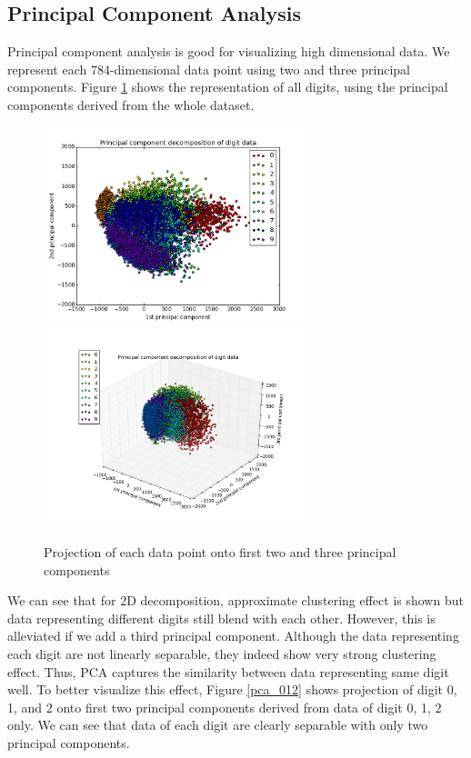 \documentclass[11pt]{article}
\begin{document}
\begin{multicols}{2}
\subsection*{Principal Component Analysis}
Principal component analysis is good for visualizing high dimensional data. We represent each 784-dimensional data point using two and three principal components. Figure \ref{pca_all} shows the representation of all digits, using the principal components derived from the whole dataset.
\begin{figure}[H]
\begin{center}
\includegraphics[width=3in]{pca_all.png}\\
\includegraphics[width=3in]{pca_all_3d.png}
\caption{Projection of each data point onto first two and three principal components}
\label{pca_all}
\end{center}
\end{figure}
We can see that for 2D decomposition, approximate clustering effect is shown but data representing different digits still blend with each other. However, this is alleviated if we add a third principal component. Although the data representing each digit are not linearly separable, they indeed show very strong clustering effect. Thus, PCA captures the similarity between data representing same digit well. To better visualize this effect, Figure \ref{pca_012} shows projection of digit 0, 1, and 2 onto first two principal components derived from data of digit 0, 1, 2 only. We can see that data of each digit are clearly separable with only two principal components.

\end{multicols}
\end{document}
